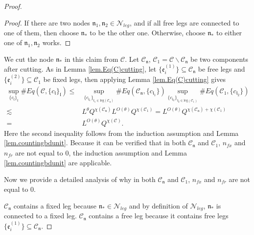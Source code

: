 \begin{proof}
\begin{proof}
    If there are two nodes $\mathfrak{n}_1, \mathfrak{n}_2\in \mathcal{N}_{leg}$, and if all free legs are connected to one of them, then choose $\mathfrak{n}_*$ to be the other one. Otherwise, choose $\mathfrak{n}_*$ to either one of $\mathfrak{n}_1, \mathfrak{n}_2$ works.
    \end{proof}
    
    We cut the node $\mathfrak{n}_*$ in this claim from $\mathcal{C}$. Let $\mathcal{C}_{\mathfrak{n}}$, $\mathcal{C}_1=\mathcal{C}\backslash \mathcal{C}_{\mathfrak{n}}$ be two components after cutting. As in Lemma \ref{lem.Eq(C)cutting}, let $\{\mathfrak{e}_{i}^{(1)}\}\subseteq \mathcal{C}_{\mathfrak{n}}$ be free legs and $\{\mathfrak{e}_{i}^{(2)}\}\subseteq \mathcal{C}_1$ be fixed legs, then applying Lemma \ref{lem.Eq(C)cutting} gives
    \begin{equation}
    \begin{split}
     \sup_{\{c_{\mathfrak{l}}\}_{\mathfrak{l}}}\#Eq(\mathcal{C},\{c_{\mathfrak{l}}\}_{\mathfrak{l}})\le&
     \sup_{\{c_{\mathfrak{l}_1}\}_{\mathfrak{l}_1\in \text{leg}(\mathcal{C}_{\mathfrak{n}})} } \# Eq(\mathcal{C}_{\mathfrak{n}},\{c_{\mathfrak{l}_1}\}) \sup_{\{c_{\mathfrak{l}_2}\}_{\mathfrak{l}_2\in \text{leg}(\mathcal{C}_1)} }\# Eq(\mathcal{C}_1, \{c_{\mathfrak{l}_2}\})
     \\
     \lesssim& L^{\theta} Q^{\chi(\mathcal{C}_{\mathfrak{n}})} L^{O(\theta)} Q^{\chi(\mathcal{C}_1)} = L^{O(\theta)} Q^{\chi(\mathcal{C}_{\mathfrak{n}})+\chi(\mathcal{C}_1)} \\
     =& L^{O(\theta)} Q^{\chi(\mathcal{C})}.
    \end{split}
    \end{equation}
    Here the second inequality follows from the induction assumption and Lemma \ref{lem.countingbdunit}. Because it can be verified that in both $\mathcal{C}_{\mathfrak{n}}$ and $\mathcal{C}_1$, $n_{\textit{fx}}$ and $n_{\textit{fr}}$ are not equal to $0$, the induction assumption and Lemma \ref{lem.countingbdunit} are applicable.
    
    Now we provide a detailed analysis of why in both $\mathcal{C}_{\mathfrak{n}}$ and $\mathcal{C}_1$, $n_{\textit{fx}}$ and $n_{\textit{fr}}$ are not equal to $0$. 
    
    $\mathcal{C}_{\mathfrak{n}}$ contains a fixed leg because $\mathfrak{n}_*\in \mathcal{N}_{leg}$ and by definition of $\mathcal{N}_{leg}$, $\mathfrak{n}_*$ is connected to a fixed leg. $\mathcal{C}_{\mathfrak{n}}$ contains a free leg because it contains free legs $\{\mathfrak{e}_{i}^{(1)}\}\subseteq \mathcal{C}_{\mathfrak{n}}$.
    

\end{proof}
